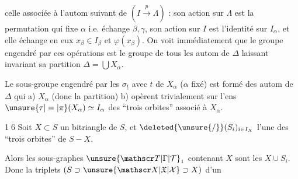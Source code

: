 celle associée à l'autom suivant de $(I\xrightarrow{p}\Lambda)$ : son action sur $\Lambda$ est la permutation qui fixe $\alpha$ i.e. échange $\beta,\gamma$, son action sur $I$ est l'identité sur $I_\alpha$, et elle échange en eux $x_\beta\in I_\beta$ et $\varphi(x_\beta)$. On voit immédiatement que le groupe engendré par ces opérations est le groupe de tous les autom de $\Delta$ laissant invariant sa partition $\Delta=\bigcup X_\alpha$.

 Le sous-groupe engendré par les $\sigma_{\underline t}$ avec $t$  de $X_\alpha$ ($\alpha$ fixé) est formé des autom de $\Delta$ qui a)  $X_\alpha$ (donc la partition)
b) opèrent trivialement sur l'ens $\unsure{\tau|=|\pi}(X_\alpha)\simeq I_\alpha$ des ``trois orbites'' associé à $X_\alpha$.

\textcircled{16} Soit $X\subset S$ un bitriangle de $S$, et $\deleted{\unsure{/}}(S_i)_{i\in I_X}$ l'une des ``trois orbites'' de $S-X$.

Alors les sous-graphes  $\unsure{\mathscr T|\Gamma|\mathcal T}_1$ \deleted{\unsure{$\subset$}} contenant $X$ sont les $X\cup S_i$. Donc la     triplets $(S\supset\unsure{\mathscr X|\mathfrak X|\mathcal X}\supset X)$ d'un  


